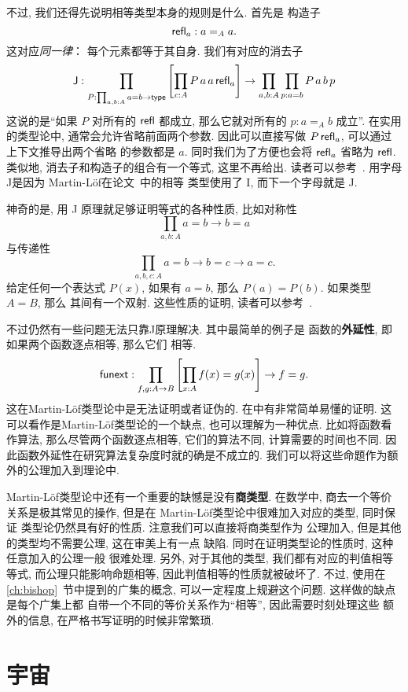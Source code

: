 不过, 我们还得先说明相等类型本身的规则是什么. 首先是
构造子
\[\textsf{refl}_a : a =_A a.\]
这对应\emph{同一律}： 每个元素都等于其自身.
我们有对应的消去子
\[\textsf{J} :
\prod_{P : \prod_{a,b:A} a = b \to \textsf{type}}
\left[\prod_{c : A} P\,a\,a\,\textsf{refl}_a\right] \to \prod_{a,b:A}\prod_{p : a=b} P\,a\,b\,p\]
这说的是“如果 \(P\) 对所有的 \(\textsf{refl}\) 都成立,
那么它就对所有的 \(p : a=_A b\) 成立”.
在实用的类型论中, 通常会允许省略前面两个参数. 因此可以直接写做
\(P\,\textsf{refl}_a\), 可以通过上下文推导出两个省略
的参数都是 \(a\). 同时我们为了方便也会将
\(\textsf{refl}_a\) 省略为 \(\textsf{refl}\).
类似地, 消去子和构造子的组合有一个等式, 这里不再给出.
读者可以参考~\cite{ufp:2013:hottbook}. 用字母J是因为
Martin-L\"of在论文~\cite{martinlof:1984:J}中的相等
类型使用了 I, 而下一个字母就是 J.

神奇的是, 用 J 原理就足够证明等式的各种性质, 比如对称性
\[\prod_{a,b:A} a = b \to b = a\]
与传递性
\[\prod_{a,b,c:A} a=b \to b=c \to a=c.\]
给定任何一个表达式 \(P(x)\), 如果有 \(a=b\),
那么 \(P(a) = P(b)\). 如果类型 \(A = B\), 那么
其间有一个双射. 这些性质的证明, 读者可以参考~\cite[\S1.12]{ufp:2013:hottbook}.

不过仍然有一些问题无法只靠J原理解决. 其中最简单的例子是
函数的\textbf{外延性}, 即如果两个函数逐点相等, 那么它们
相等.
\[\textsf{funext} : \prod_{f,g : A \to B}
\left[\prod_{x : A} f(x) = g(x)\right] \to f = g.\]
这在Martin-L\"of类型论中是无法证明或者证伪的.
在\cite{boulier:2017:syntacticmodel}中有非常简单易懂的证明.
这可以看作是Martin-L\"of类型论的一个缺点, 也可以理解为一种优点.
比如将函数看作算法, 那么尽管两个函数逐点相等, 它们的算法不同,
计算需要的时间也不同. 因此函数外延性在研究算法复杂度时就的确是不成立的.
我们可以将这些命题作为额外的公理加入到理论中.

Martin-L\"of类型论中还有一个重要的缺憾是没有\textbf{商类型}.
在数学中, 商去一个等价关系是极其常见的操作, 但是在
Martin-L\"of类型论中很难加入对应的类型, 同时保证
类型论仍然具有好的性质. 注意我们可以直接将商类型作为
公理加入, 但是其他的类型均不需要公理, 这在审美上有一点
缺陷. 同时在证明类型论的性质时, 这种任意加入的公理一般
很难处理. 另外, 对于其他的类型, 我们都有对应的判值相等等式,
而公理只能影响命题相等, 因此判值相等的性质就被破坏了.
不过, 使用在 \ref{ch:bishop}~节中提到的广集的概念,
可以一定程度上规避这个问题. 这样做的缺点是每个广集上都
自带一个不同的等价关系作为“相等”, 因此需要时刻处理这些
额外的信息, 在严格书写证明的时候非常繁琐.

\section{宇宙}

